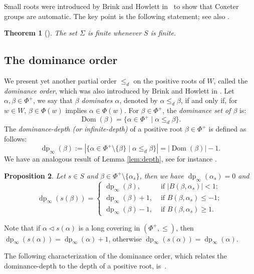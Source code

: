 \documentclass{amsart}
\newtheorem{Theorem}{Theorem}[section]
\newtheorem{Proposition}[Theorem]{Proposition}
\theoremstyle{definition}
\newcommand{\dom}{{\operatorname{Dom}}}
\newcommand{\dep}{\operatorname{dp}}
\begin{document}
Small roots were introduced by Brink and Howlett in~\cite{BH} to show that Coxeter groups are automatic. The key point is the following statement; see also \cite[Theorem 4.7.3]{BB}.

\begin{Theorem}[{\cite[Theorem~2.8]{BH}}]\label{thm:BH} The set $\Sigma$ is finite  whenever $S$ is finite. 
\end{Theorem}


\subsection{The dominance order}\label{ss:dominance}

We present yet another partial order $\leq_d$ on the positive roots of $W$, called the \textit{dominance order}, which was also introduced by Brink and Howlett in \cite{BH}.   Let $\alpha,\beta\in\Phi^+$, we say that \textit{$\beta$ dominates $\alpha$}, denoted by $\alpha\leq_d \beta$, if and only if, for $w\in W$, $\beta\in \Phi(w)$ implies $\alpha\in \Phi(w)$. For $\beta\in \Phi^+$, the {\em dominance set of $\beta$} is:
   $$
   \dom(\beta)=\{\alpha\in \Phi^+\mid \alpha\leq_d \beta\}.
   $$
    The \textit{dominance-depth (or infinite-depth)} of a positive root $\beta\in\Phi^+$ is defined as follows:
$$
    \dep_\infty(\beta):=|\{\alpha\in \Phi^+\setminus\{\beta\}\mid\alpha\leq_d\beta\}|=|\dom(\beta)|-1.
$$ 
We have an analogous result of Lemma \ref{lem:depth}, see for instance \cite[Proposition 3.3]{DH}.

\begin{Proposition}\label{prop:inf-depth}
   Let $s\in S$ and $\beta\in\Phi^+\setminus\{\alpha_s\}$, then we have $\dep_\infty(\alpha_s)=0$ and
    $$\dep_\infty(s(\beta))=\begin{cases}
        \dep_\infty(\beta), &\mbox{ if } |B(\beta, \alpha_s)|<1;\\
    \dep_\infty(\beta)+1, &\mbox{ if } B(\beta, \alpha_s)\leq -1;\\
    \dep_\infty(\beta)-1, &\mbox{ if } B(\beta, \alpha_s)\geq 1.
    \end{cases}$$
\end{Proposition}

Note that if $\alpha\lhd s(\alpha)$ is a long covering in $(\Phi^+,\leq)$, then $\dep_\infty(s(\alpha))=\dep_\infty(\alpha)+1$, otherwise $\dep_\infty(s(\alpha))=\dep_\infty(\alpha)$.

The following characterization of the dominance order, which relates the dominance-depth to the depth of a positive root, is~\cite[Lemma 2.3]{BH}.
\end{document}
